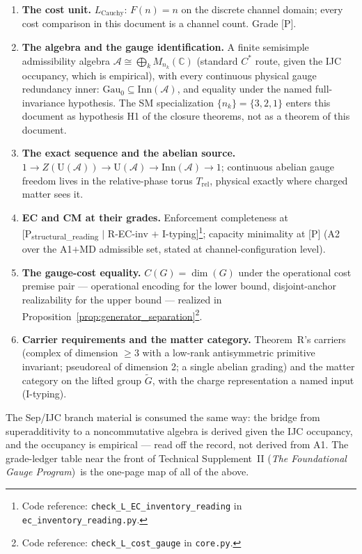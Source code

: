 \documentclass[11pt]{article}
\theoremstyle{definition}
\newcommand{\coderef}[2]{\footnote{Code reference: \texttt{#1} in \texttt{#2}.}}
\newcommand{\TSII}{Technical Supplement~II (\emph{The Foundational Gauge Program})}
\begin{document}
\begin{tcolorbox}[apfbox, title={Chain outputs consumed by this document}]
\footnotesize
\begin{enumerate}[nosep,leftmargin=1.8em]
  \item \textbf{The cost unit.}  $L_{\mathrm{Cauchy}}$: $F(n) = n$ on
  the discrete channel domain; every cost comparison in this document
  is a channel count.  Grade [P].
  \item \textbf{The algebra and the gauge identification.}  A finite
  semisimple admissibility algebra $\mathcal{A} \cong \bigoplus_k
  M_{n_k}(\mathbb{C})$ (standard $C^*$ route, given the IJC occupancy,
  which is empirical), with every continuous physical gauge redundancy
  inner: $\mathrm{Gau}_0 \subseteq \mathrm{Inn}(\mathcal{A})$, and
  equality under the named full-invariance hypothesis.  The SM
  specialization $\{n_k\} = \{3,2,1\}$ enters this document as
  hypothesis H1 of the closure theorems, not as a theorem of this
  document.
  \item \textbf{The exact sequence and the abelian source.}
  $1 \to Z(\mathrm{U}(\mathcal{A})) \to \mathrm{U}(\mathcal{A}) \to
  \mathrm{Inn}(\mathcal{A}) \to 1$; continuous abelian gauge freedom
  lives in the relative-phase torus $T_{\mathrm{rel}}$, physical
  exactly where charged matter sees it.
  \item \textbf{EC and CM at their grades.}  Enforcement completeness
  at [P\textsubscript{structural\_reading} $\mid$ R-EC-inv $+$
  I-typing]\coderef{check\_L\_EC\_inventory\_reading}{ec\_inventory\_reading.py};
  capacity minimality at [P] (A2 over the A1$+$MD admissible set,
  stated at channel-configuration level).
  \item \textbf{The gauge-cost equality.}  $C(G) = \dim(G)$ under the
  operational cost premise pair --- operational encoding for the lower
  bound, disjoint-anchor realizability for the upper bound --- realized
  in Proposition~\ref{prop:generator_separation}\coderef{check\_L\_cost\_gauge}{core.py}.
  \item \textbf{Carrier requirements and the matter category.}
  Theorem~R's carriers (complex of dimension $\ge 3$ with a low-rank
  antisymmetric primitive invariant; pseudoreal of dimension 2; a
  single abelian grading) and the matter category on the lifted group
  $\widetilde{G}$, with the charge representation a named input
  (I-typing).
\end{enumerate}
The Sep/IJC branch material is consumed the same way: the bridge from
superadditivity to a noncommutative algebra is derived given the IJC
occupancy, and the occupancy is empirical --- read off the record, not
derived from A1.  The grade-ledger table near the front of \TSII\ is
the one-page map of all of the above.
\end{tcolorbox}
\end{document}
